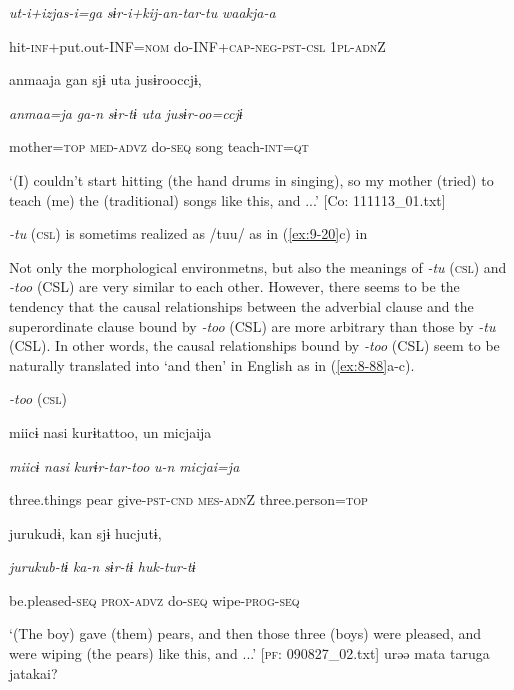       \textit{ut-i+izjas-i=ga}  \textit{sɨr-i+kij-an-tar-tu}  \textit{waakja-a}

      hit-\textsc{inf}+put.out-INF=\textsc{nom}  do-INF+\textsc{cap}-\textsc{neg}-\textsc{pst}-\textsc{csl}  1\textsc{pl}-\textsc{adn}Z

      anmaaja  gan  sjɨ  uta  jusɨrooccjɨ,

      \textit{anmaa=ja}  \textit{ga-n}  \textit{sɨr-tɨ}  \textit{uta}  \textit{jusɨr-oo=ccjɨ}

      mother=\textsc{top}  \textsc{med}-\textsc{advz}  do-\textsc{seq}  song  teach-\textsc{int}=\textsc{qt}

\glt ‘(I) couldn’t start hitting (the hand drums in singing), so my mother (tried) to teach (me) the (traditional) songs like this, and ...’ [Co: 111113\_01.txt]
\z

\textit{{}-tu} (\textsc{csl}) is sometims realized as /tuu/ as in (\ref{ex:9-20}c) in 

Not only the morphological environmetns, but also the meanings of \textit{{}-tu} (\textsc{csl}) and \textit{{}-too} (CSL) are very similar to each other. However, there seems to be the tendency that the causal relationships between the adverbial clause and the superordinate clause bound by \textit{-too} (CSL) are more arbitrary than those by \textit{{}-tu} (CSL). In other words, the causal relationships bound by \textit{{}-too} (CSL) seem to be naturally translated into ‘and then’ in English as in (\ref{ex:8-88}a-c).

\ea\label{ex:8-88}
  \textit{{}-too} (\textsc{csl})

\ea {\TM}
\glll  miicɨ  nasi  kurɨtattoo,  un  micjaija

      \textit{miicɨ}  \textit{nasi}  \textit{kurɨr-tar-too}  \textit{u-n}  \textit{micjai=ja}

      three.things  pear  give-\textsc{pst}-\textsc{cnd}  \textsc{mes}-\textsc{adn}Z  three.person=\textsc{top}

      jurukudɨ,  kan  sjɨ  hucjutɨ,

      \textit{jurukub-tɨ}  \textit{ka-n}  \textit{sɨr-tɨ}  \textit{huk-tur-tɨ}

      be.pleased-\textsc{seq}  \textsc{prox}-\textsc{advz}  do-\textsc{seq}  wipe-\textsc{prog}-\textsc{seq}

\glt ‘(The boy) gave (them) pears, and then those three (boys) were pleased, and were wiping (the pears) like this, and ...’ [\textsc{pf}: 090827\_02.txt]
\ex {\TM}
\glll  urəə  mata  taruga  jatakai?

